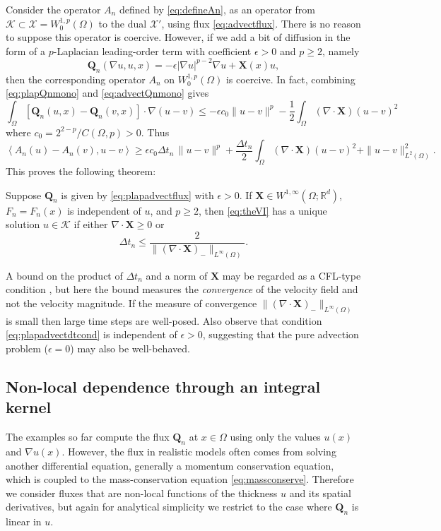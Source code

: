 \documentclass[final,leqno,onefignum,onetabnum]{siamltex1213bueler}
\newcommand\bQ{\mathbf{Q}}
\newcommand\bX{\mathbf{X}}
\newcommand{\Div}{\nabla\cdot}
\newcommand\eps{\epsilon}
\renewcommand{\grad}{\nabla}
\newcommand{\ip}[2]{\ensuremath{\left<#1,#2\right>}}
\newcommand\RR{\mathbb{R}}
\begin{document}
Consider the operator $A_n$ defined by \eqref{eq:defineAn}, as an operator from $\mathcal{K} \subset \mathcal{X} = W_0^{1,p}(\Omega)$ to the dual $\mathcal{X}'$, using flux \eqref{eq:advectflux}.  There is no reason to suppose this operator is coercive.  However, if we add a bit of diffusion in the form of a $p$-Laplacian leading-order term with coefficient $\eps>0$ and $p\ge 2$, namely
\begin{equation}
  \bQ_n(\grad u,u,x) = -\eps |\grad u|^{p-2} \grad u + \bX(x) u,   \label{eq:plapadvectflux}
\end{equation}
then the corresponding operator $A_n$ on $W_0^{1,p}(\Omega)$ is coercive.  In fact, combining \eqref{eq:plapQnmono} and \eqref{eq:advectQnmono} gives
\begin{equation}
\int_\Omega \left[\bQ_n(u,x) - \bQ_n(v,x)\right] \cdot \grad (u - v) \le - \eps c_0 \|u-v\|^p - \frac{1}{2} \int_\Omega (\Div\bX) (u-v)^2
\end{equation}
where $c_0=2^{2-p}/C(\Omega,p)>0$.  Thus
\begin{equation}
\ip{A_n(u) - A_n(v)}{u-v} \ge \eps c_0 \Delta t_n\, \|u-v\|^p + \frac{\Delta t_n}{2} \int_\Omega (\Div\bX) (u-v)^2 + \|u-v\|_{L^2(\Omega)}^2.
\end{equation}
This proves the following theorem:

\begin{theorem}  \label{thm:plapadvectwellposed}  Suppose $\bQ_n$ is given by \eqref{eq:plapadvectflux} with $\eps>0$.  If $\bX \in W^{1,\infty}(\Omega;\RR^d)$, $F_n=F_n(x)$ is independent of $u$, and $p\ge 2$, then \eqref{eq:theVI} has a unique solution $u\in\mathcal{K}$ if either $\Div \bX \ge 0$ or
\begin{equation}
  \Delta t_n \le \frac{2}{\|(\Div \bX)_-\|_{L^\infty(\Omega)}}. \label{eq:plapadvectdtcond}
\end{equation}
\end{theorem}

A bound on the product of $\Delta t_n$ and a norm of $\bX$ may be regarded as a CFL-type condition \cite{LeVeque2002}, but here the bound measures the \emph{convergence} of the velocity field and not the velocity magnitude.  If the measure of convergence $\|(\Div \bX)_-\|_{L^\infty(\Omega)}$ is small then large time steps are well-posed.  Also observe that condition \eqref{eq:plapadvectdtcond} is independent of $\eps>0$, suggesting that the pure advection problem ($\eps = 0$) may also be well-behaved.

\subsection{Non-local dependence through an integral kernel} \label{subsec:nonlocal}   The examples so far compute the flux $\bQ_n$ at $x\in\Omega$ using only the values $u(x)$ and $\grad u(x)$.  However, the flux in realistic models often comes from solving another differential equation, generally a momentum conservation equation, which is coupled to the mass-conservation equation \eqref{eq:massconserve}.  Therefore we consider fluxes that are non-local functions of the thickness $u$ and its spatial derivatives, but again for analytical simplicity we restrict to the case where $\bQ_n$ is linear in $u$.
\end{document}

